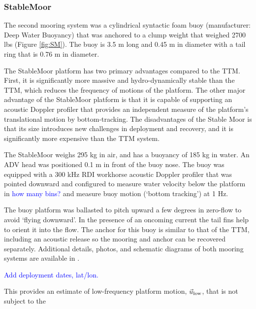 \documentclass[twocol]{ametsoc}
\newcommand{\note}[1]{\textcolor{blue}{#1}}
\begin{document}
\subsubsection{StableMoor}

The second mooring system was a cylindrical syntactic foam buoy (manufacturer: Deep Water Buoyancy) that was anchored to a clump weight that weighed 2700 lbs (Figure \ref{fig:SM}). The buoy is 3.5 m long and 0.45 m in diameter with a tail ring that is 0.76 m in diameter. 

The StableMoor platform has two primary advantages compared to the TTM. First, it is significantly more massive and hydro-dynamically stable than the TTM, which reduces the frequency of motions of the platform. The other major advantage of the StableMoor platform is that it is capable of supporting an acoustic Doppler profiler that provides an independent measure of the platform's translational motion by bottom-tracking. The disadvantages of the Stable Moor is that its size introduces new challenges in deployment and recovery, and it is significantly more expensive than the TTM system.

The StableMoor weighs 295 kg in air, and has a buoyancy of 185 kg in water. An ADV head was positioned 0.1 m in front of the buoy nose.  The buoy was equipped with a 300 kHz RDI workhorse acoustic Doppler profiler that was pointed downward and configured to measure water velocity below the platform in \note{how many bins?} and measure buoy motion (`bottom tracking') at 1 Hz. 

The buoy platform was ballasted to pitch upward a few degrees in zero-flow to avoid `flying downward'. In the presence of an oncoming current the tail fins help to orient it into the flow. The anchor for this buoy is similar to that of the TTM, including an acoustic release so the mooring and anchor can be recovered separately. Additional details, photos, and schematic diagrams of both mooring systems are available in \cite{Harding_MotionPaper}.

\note{Add deployment dates, lat/lon.}

This provides an estimate of low-frequency platform motion, $\vec{u}_\mathrm{low}$, that is not subject to the 
\end{document}
